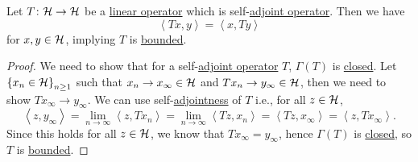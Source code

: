 \begin{proposition}\label{thm:Hellinger-Toeplitz}
	Let \(T\colon \mathcal{\MakeUppercase{h}} \to \mathcal{\MakeUppercase{h}} \) be a \hyperref[def:linear-op]{linear operator} which is self-\hyperref[def:adjoint-op]{adjoint operator}. Then we have
	\[
		\left\langle Tx, y \right\rangle  = \left\langle x, Ty \right\rangle
	\]
	for \(x, y\in \mathcal{\MakeUppercase{h}} \), implying \(T\) is \hyperref[rmk:bounded-op]{bounded}.
\end{proposition}
\begin{proof}
	We need to show that for a self-\hyperref[def:adjoint-op]{adjoint operator} \(T\), \(\Gamma (T)\) is \hyperref[def:closed-graph]{closed}. Let \(\left\{ x_n \in \mathcal{\MakeUppercase{h}} \right\} _{n\geq 1}\) such that \(x_n \to x_\infty \in \mathcal{\MakeUppercase{h}} \) and \(Tx_n \to y_\infty \in\mathcal{\MakeUppercase{h}} \), then we need to show \(Tx_\infty \to y_\infty \). We can use self-\hyperref[def:adjoint-op]{adjointness} of \(T\) i.e., for all \(z\in \mathcal{\MakeUppercase{h}} \),
	\[
		\left\langle z, y_\infty  \right\rangle = \lim\limits_{n \to \infty} \left\langle z, Tx_n \right\rangle = \lim\limits_{n \to \infty} \left\langle Tz, x_n \right\rangle = \left\langle Tz, x_\infty  \right\rangle = \left\langle z, Tx_\infty  \right\rangle.
	\]
	Since this holds for all \(z\in \mathcal{\MakeUppercase{h}} \), we know that \(Tx_\infty = y_\infty \), hence \(\Gamma (T)\) is \hyperref[def:closed-graph]{closed}, so \(T\) is \hyperref[rmk:bounded-op]{bounded}.
\end{proof}